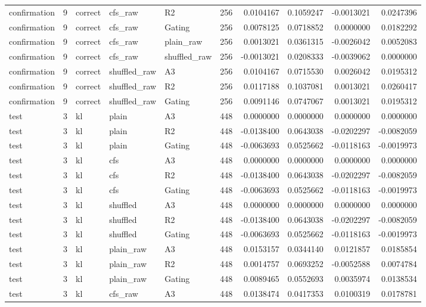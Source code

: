 \begin{tabular}{lrlllrrrrr}
confirmation & 9 & correct & cfs_raw & R2 & 256 & 0.0104167 & 0.1059247 & -0.0013021 & 0.0247396 \\
confirmation & 9 & correct & cfs_raw & Gating & 256 & 0.0078125 & 0.0718852 & 0.0000000 & 0.0182292 \\
confirmation & 9 & correct & cfs_raw & plain_raw & 256 & 0.0013021 & 0.0361315 & -0.0026042 & 0.0052083 \\
confirmation & 9 & correct & cfs_raw & shuffled_raw & 256 & -0.0013021 & 0.0208333 & -0.0039062 & 0.0000000 \\
confirmation & 9 & correct & shuffled_raw & A3 & 256 & 0.0104167 & 0.0715530 & 0.0026042 & 0.0195312 \\
confirmation & 9 & correct & shuffled_raw & R2 & 256 & 0.0117188 & 0.1037081 & 0.0013021 & 0.0260417 \\
confirmation & 9 & correct & shuffled_raw & Gating & 256 & 0.0091146 & 0.0747067 & 0.0013021 & 0.0195312 \\
test & 3 & kl & plain & A3 & 448 & 0.0000000 & 0.0000000 & 0.0000000 & 0.0000000 \\
test & 3 & kl & plain & R2 & 448 & -0.0138400 & 0.0643038 & -0.0202297 & -0.0082059 \\
test & 3 & kl & plain & Gating & 448 & -0.0063693 & 0.0525662 & -0.0118163 & -0.0019973 \\
test & 3 & kl & cfs & A3 & 448 & 0.0000000 & 0.0000000 & 0.0000000 & 0.0000000 \\
test & 3 & kl & cfs & R2 & 448 & -0.0138400 & 0.0643038 & -0.0202297 & -0.0082059 \\
test & 3 & kl & cfs & Gating & 448 & -0.0063693 & 0.0525662 & -0.0118163 & -0.0019973 \\
test & 3 & kl & shuffled & A3 & 448 & 0.0000000 & 0.0000000 & 0.0000000 & 0.0000000 \\
test & 3 & kl & shuffled & R2 & 448 & -0.0138400 & 0.0643038 & -0.0202297 & -0.0082059 \\
test & 3 & kl & shuffled & Gating & 448 & -0.0063693 & 0.0525662 & -0.0118163 & -0.0019973 \\
test & 3 & kl & plain_raw & A3 & 448 & 0.0153157 & 0.0344140 & 0.0121857 & 0.0185854 \\
test & 3 & kl & plain_raw & R2 & 448 & 0.0014757 & 0.0693252 & -0.0052588 & 0.0074784 \\
test & 3 & kl & plain_raw & Gating & 448 & 0.0089465 & 0.0552693 & 0.0035974 & 0.0138534 \\
test & 3 & kl & cfs_raw & A3 & 448 & 0.0138474 & 0.0417353 & 0.0100319 & 0.0178781 \\

\end{tabular}
